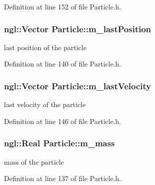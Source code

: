 Definition at line 152 of file Particle.h.

\hypertarget{class_particle_aeeb21b06bc3c2152e452226e2b25a6ea}{
\subsubsection[{m\_\-lastPosition}]{\setlength{\rightskip}{0pt plus 5cm}ngl::Vector {\bf Particle::m\_\-lastPosition}}}
\label{class_particle_aeeb21b06bc3c2152e452226e2b25a6ea}


last position of the particle 



Definition at line 140 of file Particle.h.

\hypertarget{class_particle_ac5c460e66588981d09c3aa86b920d8bb}{
\subsubsection[{m\_\-lastVelocity}]{\setlength{\rightskip}{0pt plus 5cm}ngl::Vector {\bf Particle::m\_\-lastVelocity}}}
\label{class_particle_ac5c460e66588981d09c3aa86b920d8bb}


last velocity of the particle 



Definition at line 146 of file Particle.h.

\hypertarget{class_particle_ab166ef7b23d6516e11f42adca0d6620e}{
\subsubsection[{m\_\-mass}]{\setlength{\rightskip}{0pt plus 5cm}ngl::Real {\bf Particle::m\_\-mass}}}
\label{class_particle_ab166ef7b23d6516e11f42adca0d6620e}


mass of the particle 



Definition at line 137 of file Particle.h.

